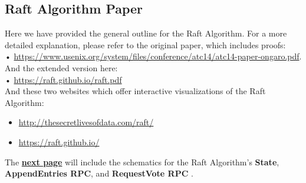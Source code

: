 \subsection{Raft Algorithm Paper}
Here we have provided the general outline for the Raft Algorithm. For a more detailed explanation, please refer to the original paper, which includes proofs:\\
• \href{https://www.usenix.org/system/files/conference/atc14/atc14-paper-ongaro.pdf}{https://www.usenix.org/system/files/conference/atc14/atc14-paper-ongaro.pdf}.\\
And the extended version here:\\
• \href{https://raft.github.io/raft.pdf}{https://raft.github.io/raft.pdf}\\
And these two websites which offer interactive visualizations of the Raft Algorithm:
\begin{itemize}
    \item \href{http://thesecretlivesofdata.com/raft/}{http://thesecretlivesofdata.com/raft/}
    \item \href{https://raft.github.io/}{https://raft.github.io/}
\end{itemize}
The \underline{\textbf{next page}} will include the schematics for the Raft Algorithm's \textbf{State}, \textbf{AppendEntries RPC}, and \textbf{RequestVote RPC} \cite{184040}.
\newpage
